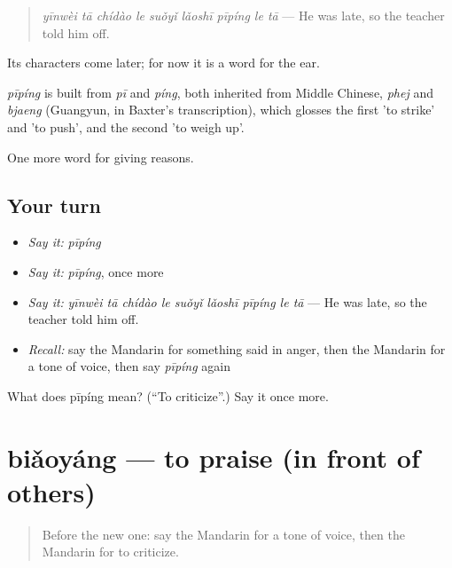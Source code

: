 \begin{quote}
\emph{yīnwèi tā chídào le suǒyǐ lǎoshī pīpíng le tā} — He was late, so the teacher told him off.
\end{quote}

Its characters come later; for now it is a word for the ear.

\begin{cousinweb}
\emph{pīpíng} is built from \emph{pī} and \emph{píng}, both inherited from Middle Chinese, \emph{phej} and \emph{bjaeng} (Guangyun, in Baxter's transcription), which glosses the first 'to strike' and 'to push', and the second 'to weigh up'.
\end{cousinweb}

\begin{grammarlens}[title={What you've built}]
One more word for giving reasons.
\end{grammarlens}

\subsection*{Your turn}
\begin{itemize}
\raggedright
  \item \emph{Say it:} \emph{pīpíng}
  \item \emph{Say it:} \emph{pīpíng}, once more
  \item \emph{Say it:} \emph{yīnwèi tā chídào le suǒyǐ lǎoshī pīpíng le tā} — He was late, so the teacher told him off.
  \item \emph{Recall:} say the Mandarin for something said in anger, then the Mandarin for a tone of voice, then say \emph{pīpíng} again
\end{itemize}

\begin{tcolorbox}[breakable,colback=teal!4,colframe=teal!35!black,title={Before you move on}]
What does pīpíng mean? (\textquotedblleft{}To criticize\textquotedblright{}.) Say it once more.
\end{tcolorbox}
\section[biǎoyáng]{biǎoyáng — to praise (in front of others)}

\label{lesson:ZH-C357-biaoyang}



\begin{quote}
Before the new one: say the Mandarin for a tone of voice, then the Mandarin for to criticize.
\end{quote}

